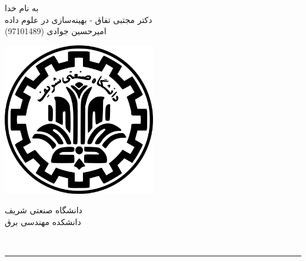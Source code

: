 \begin{minipage}{0.6\textwidth}
	\begin{bf}
		\begin{center}
			\large
			به نام خدا\\
			دکتر مجتبی تفاق - بهینه‌سازی در علوم داده \\
			\Large
			\vspace{0.4cm}
			امیرحسین جوادی (97101489)
		\end{center}
	\end{bf}
	\normalsize
\end{minipage} \hfill
\begin{minipage}{0.35\textwidth}
	\begin{flushleft}
		\includegraphics[width=0.5\textwidth]{logo.png}
	\end{flushleft}
	\begin{flushleft}
		دانشگاه صنعتی شریف\\
		دانشکده مهندسی برق\\
	\end{flushleft}
	
\end{minipage}
\\
\rule[0.1\baselineskip]{\textwidth}{1pt}
